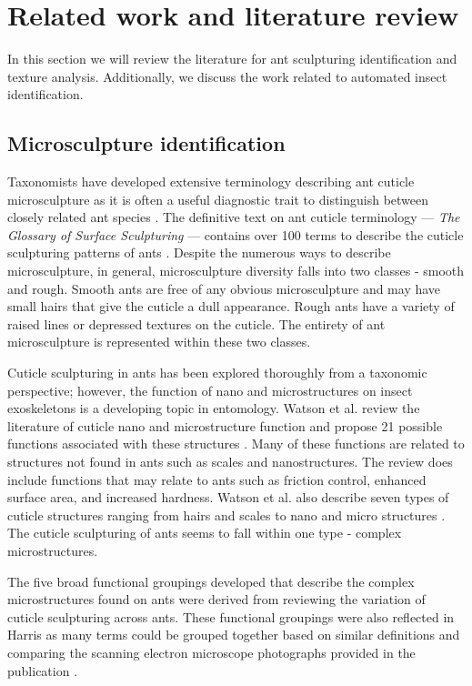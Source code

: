 \documentclass{aci}
\numberwithin{equation}{section}
\begin{document}
\section{Related work and literature review}

In this section we will review the literature for ant sculpturing identification
and texture analysis. Additionally, we discuss the work related to automated
insect identification.

\subsection{Microsculpture identification}
Taxonomists have developed extensive terminology describing ant cuticle
microsculpture as it is often a useful diagnostic trait to distinguish between
closely related ant species \cite{blaimer_taxonomy_2019,fisher_ants_2007}. The
definitive text on ant cuticle terminology — \textit{The Glossary of Surface
    Sculpturing} — contains over 100 terms to describe the cuticle sculpturing
patterns of ants \cite{harris_glossary_1979}. Despite the numerous ways to
describe microsculpture, in general, microsculpture diversity falls into two
classes - smooth and rough. Smooth ants are free of any obvious microsculpture
and may have small hairs that give the cuticle a dull appearance. Rough ants
have a variety of raised lines or depressed textures on the cuticle. The
entirety of ant microsculpture is represented within these two classes.

Cuticle sculpturing in ants has been explored thoroughly from a taxonomic
perspective; however, the function of nano and microstructures on insect
exoskeletons is a developing topic in entomology. Watson et al. review the
literature of cuticle nano and microstructure function and propose 21 possible
functions associated with these structures \cite{watson_diversity_2017}. Many of
these functions are related to structures not found in ants such as scales and
nanostructures. The review does include functions that may relate to ants such
as friction control, enhanced surface area, and increased hardness. Watson et
al. also describe seven types of cuticle structures ranging from hairs and
scales to nano and micro structures \cite{watson_diversity_2017}. The cuticle
sculpturing of ants seems to fall within one type - complex microstructures.

The five broad functional groupings developed that describe the complex
microstructures found on ants were derived from reviewing the variation of
cuticle sculpturing across ants. These functional groupings were also reflected
in Harris as many terms could be grouped together based on similar definitions
and comparing the scanning electron microscope photographs provided in the
publication \cite{harris_glossary_1979}.
\end{document}
